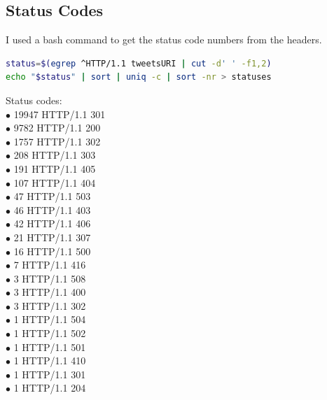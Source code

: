 \documentclass[12pt]{report}
\begin{document}
\subsection*{Status Codes}

I used a bash command to get the status code numbers from the headers.

\begin{lstlisting}[language=bash,caption={bash code}]
status=$(egrep ^HTTP/1.1 tweetsURI | cut -d' ' -f1,2)
echo "$status" | sort | uniq -c | sort -nr > statuses
\end{lstlisting}

Status codes:\\
$\bullet$  19947 HTTP/1.1 301\\
$\bullet$   9782 HTTP/1.1 200\\
$\bullet$   1757 HTTP/1.1 302\\
$\bullet$    208 HTTP/1.1 303\\
$\bullet$    191 HTTP/1.1 405\\
$\bullet$    107 HTTP/1.1 404\\
$\bullet$     47 HTTP/1.1 503\\
$\bullet$     46 HTTP/1.1 403\\
$\bullet$     42 HTTP/1.1 406\\
$\bullet$     21 HTTP/1.1 307\\
$\bullet$     16 HTTP/1.1 500\\
$\bullet$      7 HTTP/1.1 416\\
$\bullet$      3 HTTP/1.1 508\\
$\bullet$      3 HTTP/1.1 400\\
$\bullet$      3 HTTP/1.1 302\\
$\bullet$      1 HTTP/1.1 504\\
$\bullet$      1 HTTP/1.1 502\\
$\bullet$      1 HTTP/1.1 501\\
$\bullet$      1 HTTP/1.1 410\\
$\bullet$      1 HTTP/1.1 301\\
$\bullet$      1 HTTP/1.1 204
\end{document}
